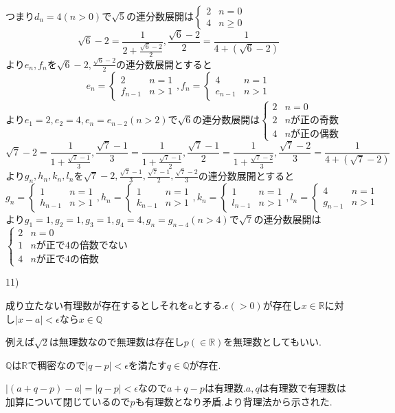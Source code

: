 \documentclass{jsarticle}
\begin{document}
つまり$d_n=4(n > 0)$で$\sqrt{5}$の連分数展開は$\begin{cases}
2 & n=0\\
4 & n\geq 0
\end{cases}$
\[\sqrt{6}-2=\frac{1}{2+\frac{\sqrt{6}-2}{2}},\frac{\sqrt{6}-2}{2}=\frac{1}{4+(\sqrt{6}-2)}\]
より$e_n,f_n$を$\sqrt{6}-2,\frac{\sqrt{6}-2}{2}$の連分数展開とすると\[e_n=\begin{cases}
2 & n=1\\
f_{n-1} & n>1
\end{cases},f_n=\begin{cases}
4 & n=1\\
e_{n-1} & n>1
\end{cases}\]
より$e_1=2,e_2=4,e_n = e_{n-2} (n>2)$で$\sqrt{6}$の連分数展開は$\begin{cases}
2 & n=0\\
2 & nが正の奇数 \\
4 & nが正の偶数
\end{cases}$
\[\sqrt{7}-2=\frac{1}{1+\frac{\sqrt{7}-1}{3}},\frac{\sqrt{7}-1}{3}=\frac{1}{1+\frac{\sqrt{7}-1}{2}},\frac{\sqrt{7}-1}{2}=\frac{1}{1+\frac{\sqrt{7}-2}{3}},\frac{\sqrt{7}-2}{3}=\frac{1}{4+(\sqrt{7}-2)}\]
より$g_n,h_n,k_n,l_n$を$\sqrt{7}-2,\frac{\sqrt{7}-1}{3},\frac{\sqrt{7}-1}{2},\frac{\sqrt{7}-2}{3}$の連分数展開とすると\[g_n=\begin{cases}
1 & n=1\\
h_{n-1} & n>1
\end{cases},h_n=\begin{cases}
1 & n=1\\
k_{n-1} & n>1
\end{cases},k_n=\begin{cases}
1 & n=1\\
l_{n-1} & n>1
\end{cases},l_n=\begin{cases}
4 & n=1\\
g_{n-1} & n>1
\end{cases}\]
より$g_1=1,g_2=1,g_3 =1, g_4=4,g_{n}=g_{n-4} (n>4)$で$\sqrt{7}$の連分数展開は$\begin{cases}
2 & n=0\\
1 & nが正で4の倍数でない \\
4 & nが正で4の倍数
\end{cases}$

11)

成り立たない有理数が存在するとしそれを$a$とする.$\epsilon (>0)$が存在し$x\in\mathbb{R}$に対し$|x-a|<\epsilon$なら$x\in\mathbb{Q}$

例えば$\sqrt{2}$は無理数なので無理数は存在し$p(\in \mathbb{R})$を無理数としてもいい.

$\mathbb{Q}$は$\mathbb{R}$で稠密なので$|q-p|<\epsilon$を満たす$q\in\mathbb{Q}$が存在.

$|(a+q-p)-a|=|q-p|<\epsilon$なので$a+q-p$は有理数.$a,q$は有理数で有理数は加算について閉じているので$p$も有理数となり矛盾.より背理法から示された.
\end{document}
